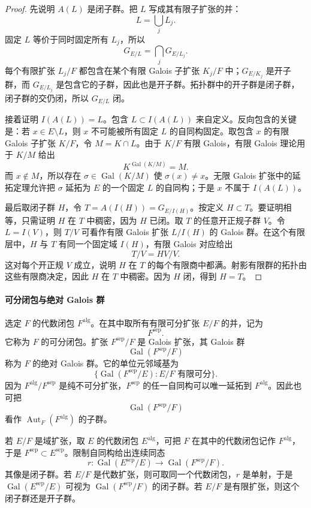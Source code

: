 \documentclass[11pt,a4paper,openany]{ctexbook}
\numberwithin{equation}{chapter}
\newcommand{\Gal}{\operatorname{Gal}}
\theoremstyle{plain}
\theoremstyle{definition}
\theoremstyle{remark}
\begin{document}
\begin{proof}
先说明 $A(L)$ 是闭子群。把 $L$ 写成其有限子扩张的并：
\[
L=\bigcup_j L_j.
\]
固定 $L$ 等价于同时固定所有 $L_j$，所以
\[
G_{E/L}=\bigcap_jG_{E/L_j}.
\]
每个有限扩张 $L_j/F$ 都包含在某个有限 Galois 子扩张 $K_j/F$ 中；$G_{E/K_j}$ 是开子群，而 $G_{E/L_j}$ 是包含它的子群，因此也是开子群。拓扑群中的开子群是闭子群，闭子群的交仍闭，所以 $G_{E/L}$ 闭。

接着证明 $I(A(L))=L$。包含 $L\subset I(A(L))$ 来自定义。反向包含的关键是：若 $x\in E\setminus L$，则 $x$ 不可能被所有固定 $L$ 的自同构固定。取包含 $x$ 的有限 Galois 子扩张 $K/F$，令 $M=K\cap L$。由于 $K/F$ 有限 Galois，有限 Galois 理论用于 $K/M$ 给出
\[
K^{\Gal(K/M)}=M.
\]
而 $x\notin M$，所以存在 $\sigma\in\Gal(K/M)$ 使 $\sigma(x)\ne x$。无限 Galois 扩张中的延拓定理允许把 $\sigma$ 延拓为 $E$ 的一个固定 $L$ 的自同构；于是 $x$ 不属于 $I(A(L))$。

最后取闭子群 $H$，令 $T=A(I(H))=G_{E/I(H)}$。按定义 $H\subset T$。要证明相等，只需证明 $H$ 在 $T$ 中稠密，因为 $H$ 已闭。取 $T$ 的任意开正规子群 $V$。令 $L=I(V)$，则 $T/V$ 可看作有限 Galois 扩张 $L/I(H)$ 的 Galois 群。在这个有限层中，$H$ 与 $T$ 有同一个固定域 $I(H)$，有限 Galois 对应给出
\[
T/V=HV/V.
\]
这对每个开正规 $V$ 成立，说明 $H$ 在 $T$ 的每个有限商中都满。射影有限群的拓扑由这些有限商决定，因此 $H$ 在 $T$ 中稠密。因为 $H$ 闭，得到 $H=T$。
\end{proof}

\paragraph{可分闭包与绝对 Galois 群}
选定 $F$ 的代数闭包 $F^{\mathrm{alg}}$。在其中取所有有限可分扩张 $E/F$ 的并，记为
\[
F^{\mathrm{sep}}.
\]
它称为 $F$ 的可分闭包。扩张 $F^{\mathrm{sep}}/F$ 是 Galois 扩张，其 Galois 群
\[
\Gal(F^{\mathrm{sep}}/F)
\]
称为 $F$ 的绝对 Galois 群。它的单位元邻域基为
\[
\{\Gal(F^{\mathrm{sep}}/E):E/F\text{ 有限可分}\}.
\]
因为 $F^{\mathrm{alg}}/F^{\mathrm{sep}}$ 是纯不可分扩张，$F^{\mathrm{sep}}$ 的任一自同构可以唯一延拓到 $F^{\mathrm{alg}}$。因此也可把
\[
\Gal(F^{\mathrm{sep}}/F)
\]
看作 $\operatorname{Aut}_F(F^{\mathrm{alg}})$ 的子群。

若 $E/F$ 是域扩张，取 $E$ 的代数闭包 $E^{\mathrm{alg}}$，可把 $F$ 在其中的代数闭包记作 $F^{\mathrm{alg}}$，于是 $F^{\mathrm{sep}}\subset E^{\mathrm{sep}}$。限制自同构给出连续同态
\[
r:\Gal(E^{\mathrm{sep}}/E)\longrightarrow \Gal(F^{\mathrm{sep}}/F).
\]
其像是闭子群。若 $E/F$ 是代数扩张，则可取同一个代数闭包，$r$ 是单射，于是 $\Gal(E^{\mathrm{sep}}/E)$ 可视为 $\Gal(F^{\mathrm{sep}}/F)$ 的闭子群。若 $E/F$ 是有限扩张，则这个闭子群还是开子群。
\end{document}

